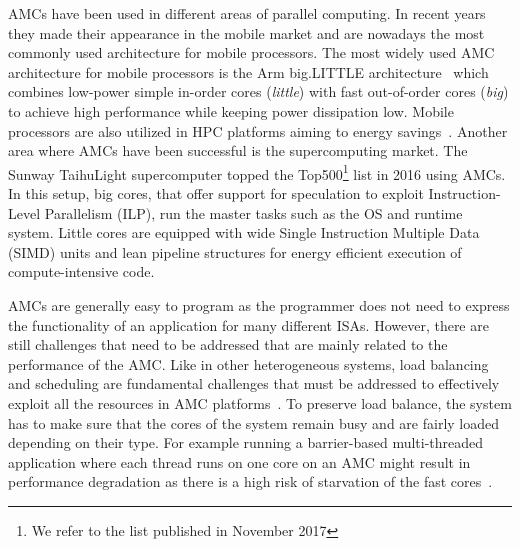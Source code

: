 AMCs have been used in different areas of parallel computing. 
In recent years they made their appearance in the mobile market and are nowadays the most commonly used architecture for mobile processors.
The most widely used AMC architecture for mobile processors is the Arm big.LITTLE architecture~\cite{Greenhalgh2011} which combines low-power simple in-order cores (\emph{little}) with fast out-of-order cores (\emph{big}) to achieve high performance while keeping power dissipation low.
Mobile processors are also utilized in HPC platforms aiming to energy savings~\cite{ARMV8}.
Another area where AMCs have been successful is the supercomputing market.
The Sunway TaihuLight supercomputer topped the Top500\footnote{We refer to the list published in November 2017} list in 2016 using AMCs. 
In this setup, big cores, that offer support for speculation to exploit Instruction-Level Parallelism (ILP), run the master tasks such as the OS and runtime system.
Little cores are equipped with wide Single Instruction Multiple Data (SIMD) units and lean pipeline structures for energy efficient execution of compute-intensive code. 

AMCs are generally easy to program as the programmer does not need to express the functionality of an application for many different ISAs. 
However, there are still challenges that need to be addressed that are mainly related to the performance of the AMC.
Like in other heterogeneous systems, load balancing and scheduling are fundamental challenges that must be addressed to effectively exploit all the resources in AMC platforms~\cite{Suleman:APLOS2009,Fedorova2009,Greenhalgh2011,Joao:ASPLOS2012,Joao:ISCA2013,ARM4HPC_SC13}. 
To preserve load balance, the system has to make sure that the cores of the system remain busy and are fairly loaded depending on their type.
For example running a barrier-based multi-threaded application where each thread runs on one core on an AMC might result in performance degradation as there is a high risk of starvation of the fast cores~\cite{AMC_survey}. %

